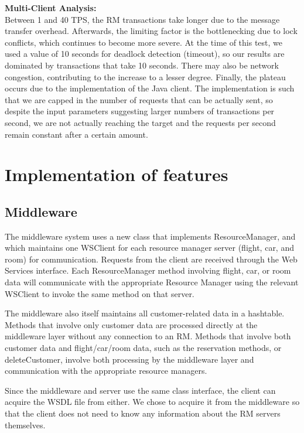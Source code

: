 \documentclass[11pt]{article}
\begin{document}
\textbf{Multi-Client Analysis:}\\
Between 1 and 40 TPS, the RM transactions take longer due to the message transfer overhead. Afterwards, the limiting factor is the bottlenecking due to lock conflicts, which continues to become more severe. At the time of this test, we used a value of 10 seconds for deadlock detection (timeout), so our results are dominated by transactions that take 10 seconds. There may also be network congestion, contributing to the increase to a lesser degree. Finally, the plateau occurs due to the implementation of the Java client. The implementation is such that we are capped in the number of requests that can be actually sent, so despite the input parameters suggesting larger numbers of transactions per second, we are not actually reaching the target and the requests per second remain constant after a certain amount.

\section*{Implementation of features}

\subsection*{Middleware}

The middleware system uses a new class that implements ResourceManager, and which maintains one WSClient for each resource manager server (flight, car, and room) for communication. Requests from the client are received through the Web Services interface. Each ResourceManager method involving flight, car, or room data will communicate with the appropriate Resource Manager using the relevant WSClient to invoke the same method on that server.  \par

The middleware also itself maintains all customer-related data in a hashtable. Methods that involve only customer data are processed directly at the middleware layer without any connection to an RM. Methods that involve both customer data and flight/car/room data, such as the reservation methods, or deleteCustomer, involve both processing by the middleware layer and communication with the appropriate resource managers.  \par

Since the middleware and server use the same class interface, the client can acquire the WSDL file from either. We chose to acquire it from the middleware so that the client does not need to know any information about the RM servers themselves.  \par
\end{document}
